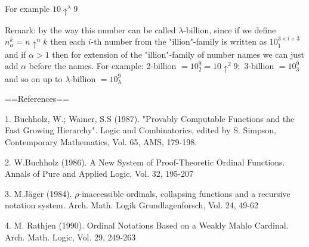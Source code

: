 \documentclass[10pt]{article}
\begin{document}
For example \(10\uparrow^{\lambda}9\)

Remark: by the way this number can be called  \(\lambda\)-billion, since if we define \(n_\alpha^k=n\uparrow^\alpha k\) then each \(i\)-th number from the "illion"-family is written as  \(10_1^{3\times i+3}\) and if \(\alpha>1\) then for extension of the "illion"-family of number names we can just add \(\alpha\) before the names.
For example: 2-billion \(=10_2^9=10\uparrow^2 9;\) 3-billion \(=10_3^9\) and so on up to  \(\lambda\)-billion \(=10_\lambda^9\)

==References==

1. Buchholz, W.; Wainer, S.S (1987). "Provably Computable Functions and the Fast Growing Hierarchy". Logic and Combinatorics, edited by S. Simpson, Contemporary Mathematics, Vol. 65, AMS, 179-198.

2. W.Buchholz (1986). A New System of Proof-Theoretic Ordinal Functions. Annals of Pure and Applied Logic, Vol. 32, 195-207

3. M.Jäger (1984). \(\rho\)-inaccessible ordinals, collapsing functions and a recursive notation system. Arch. Math. Logik Grundlagenforsch, Vol. 24, 49-62

4. M. Rathjen (1990). Ordinal Notations Based on a Weakly Mahlo Cardinal. Arch. Math. Logic, Vol. 29, 249-263
\end{document}
